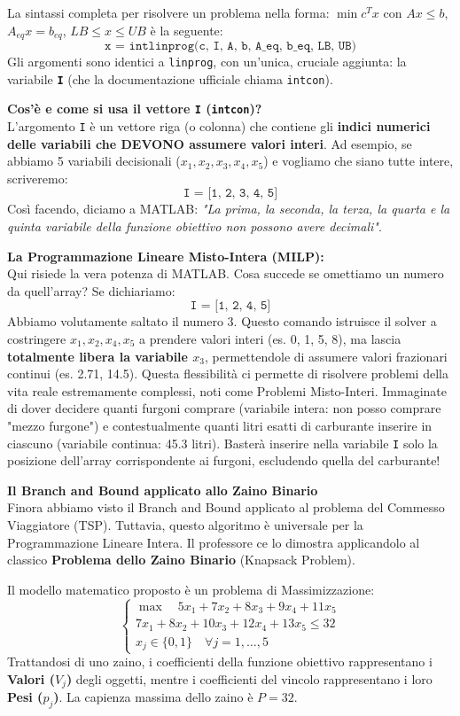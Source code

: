 \documentclass[12pt, a4paper]{article}
\begin{document}
	La sintassi completa per risolvere un problema nella forma:
	$\min c^T x$ con $A x \leq b$, $A_{eq} x = b_{eq}$, $LB \leq x \leq UB$ è la seguente:
	\[
	\texttt{x = intlinprog(c, I, A, b, A\_eq, b\_eq, LB, UB)}
	\]
	Gli argomenti sono identici a \texttt{linprog}, con un'unica, cruciale aggiunta: la variabile \textbf{\texttt{I}} (che la documentazione ufficiale chiama \texttt{intcon}).
	
	\textbf{Cos'è e come si usa il vettore \texttt{I} (\texttt{intcon})?}\\
	L'argomento \texttt{I} è un vettore riga (o colonna) che contiene gli \textbf{indici numerici delle variabili che DEVONO assumere valori interi}. 
	Ad esempio, se abbiamo 5 variabili decisionali ($x_1, x_2, x_3, x_4, x_5$) e vogliamo che siano tutte intere, scriveremo:
	\[
	\texttt{I = [1, 2, 3, 4, 5]}
	\]
	Così facendo, diciamo a MATLAB: \textit{"La prima, la seconda, la terza, la quarta e la quinta variabile della funzione obiettivo non possono avere decimali"}.
	
	\textbf{La Programmazione Lineare Misto-Intera (MILP):}\\
	Qui risiede la vera potenza di MATLAB. Cosa succede se omettiamo un numero da quell'array?
	Se dichiariamo:
	\[
	\texttt{I = [1, 2, 4, 5]}
	\]
	Abbiamo volutamente saltato il numero 3. Questo comando istruisce il solver a costringere $x_1, x_2, x_4, x_5$ a prendere valori interi (es. 0, 1, 5, 8), ma lascia \textbf{totalmente libera la variabile $x_3$}, permettendole di assumere valori frazionari continui (es. 2.71, 14.5).
	Questa flessibilità ci permette di risolvere problemi della vita reale estremamente complessi, noti come Problemi Misto-Interi. Immaginate di dover decidere quanti furgoni comprare (variabile intera: non posso comprare "mezzo furgone") e contestualmente quanti litri esatti di carburante inserire in ciascuno (variabile continua: 45.3 litri). Basterà inserire nella variabile \texttt{I} solo la posizione dell'array corrispondente ai furgoni, escludendo quella del carburante!
	
	\vspace{0.6cm}
	\textbf{Il Branch and Bound applicato allo Zaino Binario}\\
	Finora abbiamo visto il Branch and Bound applicato al problema del Commesso Viaggiatore (TSP). Tuttavia, questo algoritmo è universale per la Programmazione Lineare Intera. Il professore ce lo dimostra applicandolo al classico \textbf{Problema dello Zaino Binario} (Knapsack Problem).
	
	Il modello matematico proposto è un problema di Massimizzazione:
	\[
	\begin{cases}
		\max \quad 5x_1 + 7x_2 + 8x_3 + 9x_4 + 11x_5 \\[6pt]
		7x_1 + 8x_2 + 10x_3 + 12x_4 + 13x_5 \leq 32 \\[6pt]
		x_j \in \{0, 1\} \quad \forall j = 1, \dots, 5
	\end{cases}
	\]
	Trattandosi di uno zaino, i coefficienti della funzione obiettivo rappresentano i \textbf{Valori ($V_j$)} degli oggetti, mentre i coefficienti del vincolo rappresentano i loro \textbf{Pesi ($p_j$)}. La capienza massima dello zaino è $P = 32$.
	
\end{document}
